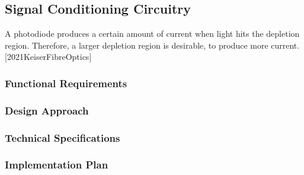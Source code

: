 \subsection{Signal Conditioning Circuitry} %
A photodiode produces a certain amount of current when light hits the depletion region. Therefore, a larger depletion region is desirable, to produce more current. [2021KeiserFibreOptics]


\subsubsection{Functional Requirements}

\subsubsection{Design Approach}

\subsubsection{Technical Specifications}

\subsubsection{Implementation Plan}


